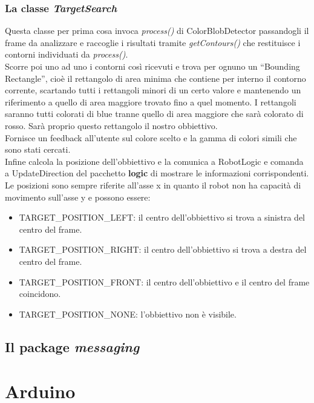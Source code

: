 \subsubsection{La classe \emph{TargetSearch}}
Questa classe per prima cosa invoca \emph{process()} di ColorBlobDetector passandogli
il frame da analizzare e raccoglie i risultati tramite \emph{getContours()} che restituisce 
i contorni individuati da \emph{process()}.\\
Scorre poi uno ad uno i contorni così ricevuti e trova per ognuno un ``Bounding Rectangle'', 
cioè il rettangolo di area minima che contiene per interno il contorno corrente, 
scartando tutti i rettangoli minori di un certo valore e mantenendo un riferimento 
a quello di area maggiore trovato fino a quel momento. I rettangoli saranno tutti colorati di blue
 tranne quello di area maggiore che sarà colorato di rosso. Sarà proprio questo 
 rettangolo il nostro obbiettivo.\\
 Fornisce un feedback all'utente sul colore scelto e la gamma di colori simili 
 che sono stati cercati.\\
 Infine calcola la posizione dell'obbiettivo e la comunica a RobotLogic e comanda 
 a UpdateDirection del pacchetto \textbf{logic} di mostrare le informazioni corrispondenti.
 Le posizioni sono sempre riferite all'asse x in quanto il robot non 
 ha capacità di movimento sull'asse y e possono essere:
 \begin{itemize}
	\item TARGET_POSITION_LEFT: il centro dell'obbiettivo si trova a sinistra del centro del frame. 
	\item TARGET_POSITION_RIGHT: il centro dell'obbiettivo si trova a destra del centro del frame. 
	\item TARGET_POSITION_FRONT: il centro dell'obbiettivo e il centro del frame coincidono. 
	\item TARGET_POSITION_NONE: l'obbiettivo non è visibile.
\end{itemize}

\subsection{Il package \textit{messaging}}



 



\section {Arduino} 